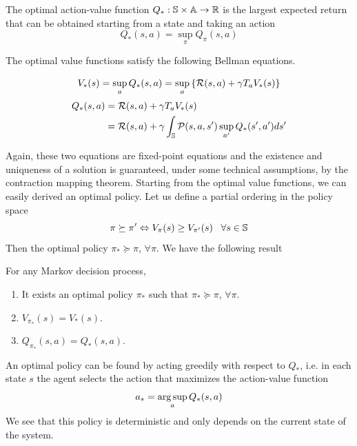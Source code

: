 \begin{definition}
	The optimal action-value function $Q_*: \S \times \A \to \R$ is the largest
	expected return that can be obtained starting from a state and taking an
	action
	\begin{equation}
		Q_*(s,a) = \sup_\pi Q_\pi(s,a)
	\end{equation}
\end{definition}
The optimal value functions satisfy the following Bellman equations.
\begin{proposition}
	\begin{equation}
		V_*(s) = \sup_a Q_*(s,a) = \sup_a \left\{\calR(s,a) + \gamma T_a V_*(s)\right\}
	\end{equation}
	\begin{equation}
		\begin{split}
			Q_*(s,a) &= \calR(s,a) + \gamma T_a V_*(s)\\
					 &= \calR(s,a) + \gamma \int_\S \calP(s,a,s') \sup_{a'} Q_*(s', a') ds'
		\end{split}
	\end{equation}
\end{proposition}
Again, these two equations are fixed-point equations and the existence and
uniqueness of a solution is guaranteed, under some technical assumptions, by 
the contraction mapping theorem. Starting from the optimal value functions, we
can easily derived an optimal policy. Let us define a partial ordering in the 
policy space
\begin{equation}
	\pi \succeq \pi' \Leftrightarrow V_\pi(s) \geq V_{\pi'}(s) \;\;\; \forall s \in \S
\end{equation}
Then the optimal policy $\pi_* \succeq \pi$, $\forall \pi$. We have the
following result
\begin{theorem}
	For any Markov decision process,
	\begin{enumerate}[label={\roman*)}]
		\item It exists an optimal policy $\pi_*$ such that $\pi_* \succeq
			\pi$, $\forall \pi$. 
		\item $V_{\pi_*}(s) = V_*(s)$.
		\item $Q_{\pi_*}(s,a) = Q_*(s,a)$. 
	\end{enumerate}
\end{theorem}
An optimal policy can be found by acting greedily with respect to $Q_*$, i.e. in each state $s$ the agent selects the action that maximizes the action-value function
\begin{equation}
	a_* = \argsup_a Q_*(s,a)
\end{equation}
We see that this policy is deterministic and only depends on the current state
of the system.

